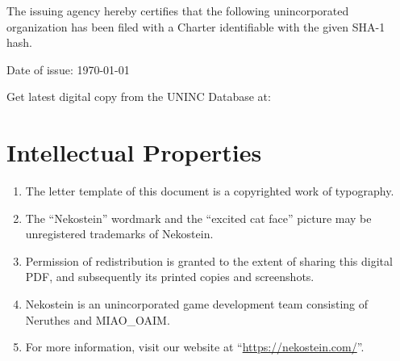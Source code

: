 \setupdecorations
{}


The issuing agency hereby certifies that the following unincorporated organization has been filed
with a Charter identifiable with the given SHA-1 hash.




\vfill

\small
\strut Date of issue: \today\par
\strut Get latest digital copy from the UNINC Database at:\par
\strut 



\clearpage
\rmfamily\normalsize








\fakenewdoc
{}


\hsepline
\clearpage





\fakenewdoc
{}


\hsepline
\clearpage





\fakenewdoc
{}


\section{Intellectual Properties}
\begin{enumerate}
    \item The letter template of this document is a copyrighted work of typography.
    \item The ``Nekostein'' wordmark and the ``excited cat face'' picture may be unregistered trademarks of Nekostein.
    \item Permission of redistribution is granted to the extent of sharing this digital PDF,
        and subsequently its printed copies and screenshots.
    \item Nekostein is an unincorporated game development team consisting of Neruthes and MIAO\_OAIM.
    \item For more information, visit our website at ``\href{https://nekostein.com/}{https://nekostein.com/}''.
\end{enumerate}


